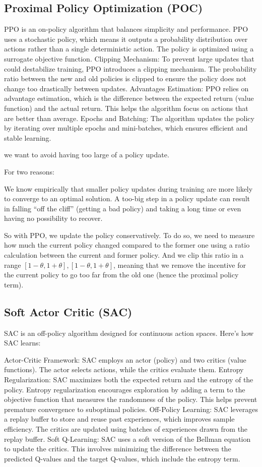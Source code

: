 \documentclass{article}
\begin{document}
\subsection{Proximal Policy Optimization (POC)}
PPO is an on-policy algorithm that balances simplicity and performance. PPO uses a stochastic policy, which means it outputs a probability distribution over actions rather than a single deterministic action. The policy is optimized using a surrogate objective function.
Clipping Mechanism: To prevent large updates that could destabilize training, PPO introduces a clipping mechanism. The probability ratio between the new and old policies is clipped to ensure the policy does not change too drastically between updates.
Advantages Estimation: PPO relies on advantage estimation, which is the difference between the expected return (value function) and the actual return. This helps the algorithm focus on actions that are better than average.
Epochs and Batching: The algorithm updates the policy by iterating over multiple epochs and mini-batches, which ensures efficient and stable learning.


we want to avoid having too large of a policy update.

For two reasons:

We know empirically that smaller policy updates during training are more likely to converge to an optimal solution.
A too-big step in a policy update can result in falling “off the cliff” (getting a bad policy) and taking a long time or even having no possibility to recover.

So with PPO, we update the policy conservatively. To do so, we need to measure how much the current policy changed compared to the former one using a ratio calculation between the current and former policy. And we clip this ratio in a range
$[ 1 -  \theta, 1 + \theta], [1-\theta,1+\theta]$, meaning that we remove the incentive for the current policy to go too far from the old one (hence the proximal policy term).

\subsection{Soft Actor Critic (SAC)}
SAC is an off-policy algorithm designed for continuous action spaces. Here's how SAC learns:

Actor-Critic Framework: SAC employs an actor (policy) and two critics (value functions). The actor selects actions, while the critics evaluate them.
Entropy Regularization: SAC maximizes both the expected return and the entropy of the policy. Entropy regularization encourages exploration by adding a term to the objective function that measures the randomness of the policy. This helps prevent premature convergence to suboptimal policies.
Off-Policy Learning: SAC leverages a replay buffer to store and reuse past experiences, which improves sample efficiency. The critics are updated using batches of experiences drawn from the replay buffer.
Soft Q-Learning: SAC uses a soft version of the Bellman equation to update the critics. This involves minimizing the difference between the predicted Q-values and the target Q-values, which include the entropy term.
\end{document}
